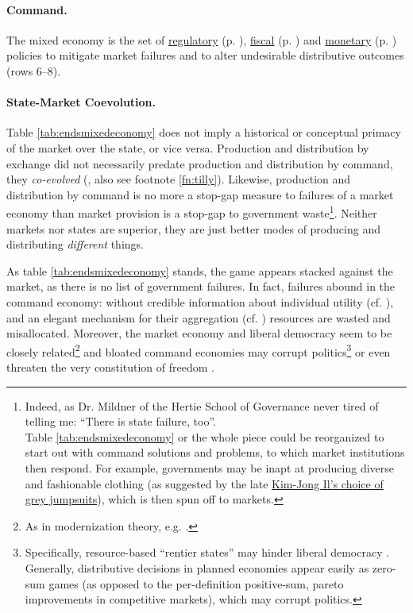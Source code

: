 \paragraph[Command]{Command.}  \label{sec:command} The mixed economy is the set of \hyperref[sec:regulatory]{regulatory} (p. \pageref{sec:regulatory}), \hyperref[sec:fiscal]{fiscal} (p. \pageref{sec:fiscal}) and \hyperref[sec:monetary]{monetary} (p. \pageref{sec:monetary}) policies to mitigate market failures and to alter undesirable distributive outcomes (rows 6--8).

\paragraph{State-Market Coevolution.} Table \ref{tab:endsmixedeconomy} does not imply a historical or conceptual primacy of the market over the state, or vice versa. Production and distribution by exchange did not necessarily predate production and distribution by command, they \emph{co-evolved} (\citealt{Tilly-1985-aa}, also see footnote \ref{fn:tilly}). Likewise, production and distribution by command is no more a stop-gap measure to failures of a market economy than market provision is a stop-gap to government waste\footnote
	{Indeed, as Dr. Mildner of the Hertie School of Governance never tired of telling me: ``There is state failure, too''. \\
	Table \ref{tab:endsmixedeconomy} or the whole piece could be reorganized to start out with command solutions and problems, to which market institutions then respond. For example, governments may be inapt at producing diverse and fashionable clothing (as suggested by the late \href{http://kimjongillookingatthings.tumblr.com/}{Kim-Jong Il's choice of grey jumpsuits}), which is then spun off to markets.}. 
Neither markets nor states are superior, they are just better modes of producing and distributing \emph{different} things.

As table \ref{tab:endsmixedeconomy} stands, the game appears stacked against the market, as there is no list of government failures. In fact, failures abound in the command economy: without credible information about individual utility (cf. \citealt{Hayek1931}), and an elegant mechanism for their aggregation (cf. \citealt{Lerner1944, Lange1934, Debreu1954}) resources are wasted and misallocated. Moreover, the market economy and liberal democracy seem to be closely related\footnote{
	As in modernization theory, e.g. \cite{InglehartWelzel-2005-aa}.} 
and bloated command economies may corrupt politics\footnote{
	Specifically, resource-based ``rentier states'' may hinder liberal democracy \citep{Beblawi1990}. Generally, distributive decisions in planned economies appear easily as zero-sum games (as opposed to the per-definition positive-sum, pareto improvements in competitive markets), which may corrupt politics.} 
or even threaten the very constitution of freedom \citep{Hayek1944, Friedman1962}.

